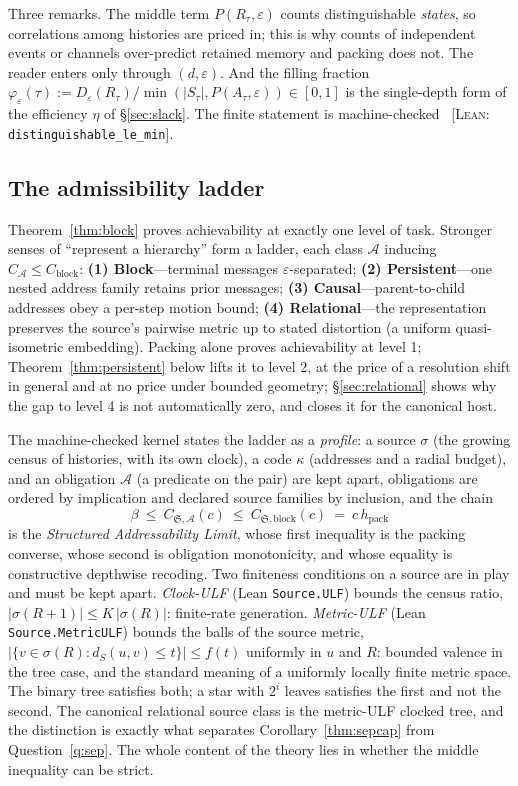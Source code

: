 \documentclass[11pt,reqno]{amsart}
\theoremstyle{plain}
\theoremstyle{definition}
\newcommand{\hpack}{h_{\mathrm{pack}}}
\newcommand{\Cblock}{C_{\mathrm{block}}}
\newcommand{\eps}{\varepsilon}
\newcommand{\cert}[1]{{\footnotesize\ [\textsc{Lean}: \texttt{#1}]}}
\begin{document}
Three remarks. The middle term $P(R_\tau,\eps)$ counts distinguishable \emph{states}, so correlations among histories are priced in; this is why counts of independent events or channels over-predict retained memory and packing does not. The reader enters only through $(d,\eps)$. And the filling fraction $\varphi_\eps(\tau):=D_\eps(R_\tau)/\min(|S_\tau|,P(A_\tau,\eps))\in[0,1]$ is the single-depth form of the efficiency $\eta$ of \S\ref{sec:slack}. The finite statement is machine-checked \cert{distinguishable\_\allowbreak{}le\_\allowbreak{}min}.

\subsection{The admissibility ladder}\label{sec:ladder}

Theorem~\ref{thm:block} proves achievability at exactly one level of task. Stronger senses of ``represent a hierarchy'' form a ladder, each class $\mathcal A$ inducing $C_{\mathcal A}\le\Cblock$: \textbf{(1) Block}---terminal messages $\eps$-separated; \textbf{(2) Persistent}---one nested address family retains prior messages; \textbf{(3) Causal}---parent-to-child addresses obey a per-step motion bound; \textbf{(4) Relational}---the representation preserves the source's pairwise metric up to stated distortion (a uniform quasi-isometric embedding). Packing alone proves achievability at level 1; Theorem~\ref{thm:persistent} below lifts it to level 2, at the price of a resolution shift in general and at no price under bounded geometry; \S\ref{sec:relational} shows why the gap to level 4 is not automatically zero, and closes it for the canonical host.

The machine-checked kernel states the ladder as a \emph{profile}: a source $\sigma$ (the growing census of histories, with its own clock), a code $\kappa$ (addresses and a radial budget), and an obligation $\mathcal A$ (a predicate on the pair) are kept apart, obligations are ordered by implication and declared source families by inclusion, and the chain
\[
\beta\ \le\ C_{\mathfrak S,\mathcal A}(c)\ \le\ C_{\mathfrak S,\mathrm{block}}(c)\ =\ c\,\hpack
\]
is the \emph{Structured Addressability Limit}, whose first inequality is the packing converse, whose second is obligation monotonicity, and whose equality is constructive depthwise recoding. Two finiteness conditions on a source are in play and must be kept apart. \emph{Clock-ULF} (Lean \texttt{Source.ULF}) bounds the census ratio, $|\sigma(R{+}1)|\le K\,|\sigma(R)|$: finite-rate generation. \emph{Metric-ULF} (Lean \texttt{Source.MetricULF}) bounds the balls of the source metric, $|\{v\in\sigma(R):d_S(u,v)\le t\}|\le f(t)$ uniformly in $u$ and $R$: bounded valence in the tree case, and the standard meaning of a uniformly locally finite metric space. The binary tree satisfies both; a star with $2^i$ leaves satisfies the first and not the second. The canonical relational source class is the metric-ULF clocked tree, and the distinction is exactly what separates Corollary~\ref{thm:sepcap} from Question~\ref{q:sep}. The whole content of the theory lies in whether the middle inequality can be strict.
\end{document}
